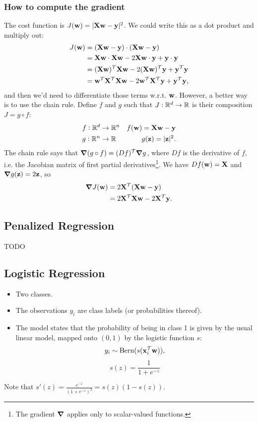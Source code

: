 \subsubsection{How to compute the gradient}

The cost function is $J(\mathbf w) = |\mathbf X\mathbf w - \mathbf y|^2$. We could write this as a dot product and
multiply out:
\begin{align*}
  J(\mathbf w) &= (\mathbf X\mathbf w - \mathbf y) \cdot (\mathbf X\mathbf w - \mathbf y) \\
  &= \mathbf X\mathbf w \cdot \mathbf X\mathbf w - 2 \mathbf X\mathbf w \cdot \mathbf y + \mathbf y \cdot \mathbf y \\
  &= (\mathbf X\mathbf w)^\mathcal T \mathbf X\mathbf w - 2 (\mathbf X\mathbf w)^\mathcal T \mathbf y + \mathbf y^\mathcal T \mathbf y \\
  &= \mathbf w^T\mathbf X^\mathcal T\mathbf X\mathbf w - 2 \mathbf w^\mathcal T\mathbf X^\mathcal T\mathbf y + \mathbf y^\mathcal T \mathbf y,
\end{align*}
and then we'd need to differentiate those terms w.r.t. $\mathbf w$. However, a better
way is to use the chain rule. Define $f$ and $g$ such that
$J: \mathbb{R}^d \rightarrow \mathbb{R}$ is their composition $J = g \circ f$:
\begin{align*}
  &f: \mathbb{R}^d \rightarrow \mathbb{R}^n     &f(\mathbf w) = \mathbf X\mathbf w - \mathbf y \\
  &g: \mathbb{R}^n \rightarrow \mathbb{R}       &g(\mathbf z) = |\mathbf z|^2.
\end{align*}
The chain rule says that $\grad (g \circ f) = (D f)^\mathcal T \grad g$, where $D f$ is
the derivative of $f$, i.e. the Jacobian matrix of first partial
derivatives\footnote{The gradient $\grad$ applies only to scalar-valued
functions.}. We have $D f(\mathbf w) = \mathbf X$ and $\grad g(\mathbf z) = 2\mathbf z$, so
\begin{align*}
  \grad J(\mathbf w)
  &= 2\mathbf X^\mathcal T(\mathbf X\mathbf w - \mathbf y) \\
  &= 2\mathbf X^\mathcal T\mathbf X\mathbf w - 2\mathbf X^\mathcal T\mathbf y.
\end{align*}

\subsection{Penalized Regression}
TODO

\subsection{Logistic Regression}

\begin{itemize}
\item Two classes.
\item The observations $y_i$ are class labels (or probabilities thereof).
\item The model states that the probability of being in class 1 is given by the
  usual linear model, mapped onto $(0, 1)$ by the logistic function $s$:
  $$y_i \sim \operatorname{\text{Bern}}(s(\mathbf x_i^\mathcal T\mathbf w)),$$
  $$s(z) = \frac{1}{1 + e^{-z}}$$
\end{itemize}
Note that $s'(z) = \frac{e^{-z}}{(1 + e^{-z})^2} = s(z)(1 - s(z))$.

